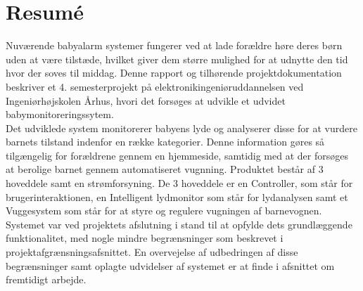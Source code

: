 \chapter{Resumé}

Nuværende babyalarm systemer fungerer ved at lade forældre høre deres børn uden at være tilstæde, hvilket giver dem større mulighed for at udnytte den tid hvor der soves til middag.
Denne rapport og tilhørende projektdokumentation beskriver et 4. semesterprojekt på elektronikingeniøruddannelsen ved Ingeniørhøjskolen Århus, hvori det forsøges at udvikle et udvidet babymonitoreringssytem.\\
Det udviklede system monitorerer babyens lyde og analyserer disse for at vurdere barnets tilstand indenfor en række kategorier. Denne information gøres så tilgængelig for forældrene gennem en hjemmeside, samtidig med at der forsøges at berolige barnet gennem automatiseret vugnning.
Produktet består af 3 hoveddele samt en strømforsyning. De 3 hoveddele er en Controller, som står for brugerinteraktionen, en Intelligent lydmonitor som står for lydanalysen samt et Vuggesystem som står for at styre og regulere vugningen af barnevognen. \\
Systemet var ved projektets afslutning i stand til at opfylde dets grundlæggende funktionalitet, med nogle mindre begrænsninger som beskrevet i projektafgrænsningsafsnittet. En overvejelse af udbedringen af disse begrænsninger samt oplagte udvidelser af systemet er at finde i afsnittet om fremtidigt arbejde.\\

%
%
%
